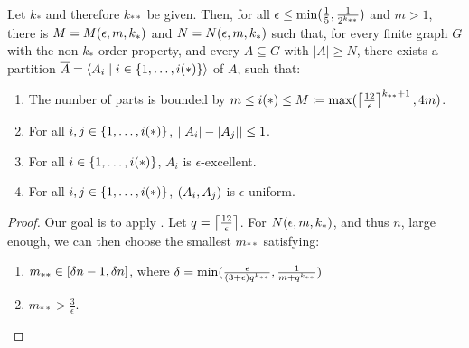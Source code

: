         \begin{theorem}[Theorem 5.18] \label{thm:minimal_conditions_for_excellent_partitions}
            Let $k_*$ and therefore $k_{**}$ be given.
            Then, for all $\epsilon \leq \min ( \frac{1}{5}, \frac{1}{2^{k_{**}}} )$ and $m > 1$, there is $M = M( \epsilon, m, k_* )$
            and $N = N( \epsilon, m, k_* )$ such that, for every finite graph $G$ with the non-$k_{*}$-order property, and
            every $A \subseteq G$ with $|A| \geq N$, there exists a partition $\overline{A} = \left< A_i \mid i \in \{ 1, \dots, i(*) \} \right>$
            of $A$, such that:
            \begin{enumerate}
                \item \label{itm:minimal_conditions_for_excellent_partitions.0} The number of parts is bounded by
                    $m \leq i(*) \leq M \coloneqq \max ( \left\lceil \frac{12}{\epsilon} \right\rceil^{k_{**}+1}, 4m )$.
                \item \label{itm:minimal_conditions_for_excellent_partitions.1}
                    For all $i, j \in \{ 1, \dots, i(*) \}$, $| | A_i |- | A_j | | \leq 1$.
                \item \label{itm:minimal_conditions_for_excellent_partitions.2}
                    For all $i \in \{ 1, \dots, i(*) \}$, $A_i$ is $\epsilon$-excellent.
                \item \label{itm:minimal_conditions_for_excellent_partitions.3}
                    For all $i, j \in \{ 1, \dots, i(*) \}$, $( A_i, A_j )$ is $\epsilon$-uniform.  
            \end{enumerate}
            \begin{proof}
                Our goal is to apply .
                Let $q = \left\lceil \frac{12}{\epsilon} \right\rceil$.
                For $N( \epsilon, m, k_* )$, and thus $n$, large enough, we can then choose the smallest $m_{**}$ satisfying:
                \begin{enumerate}[label=(\alph*), ref=\alph*]
                    \item \label{itm:minimal_conditions_for_excellent_partitions.a} $m_{**} \in [ \delta n -1, \delta n ]$, where
                        $\delta = \min ( \frac{\epsilon}{( 3 + \epsilon ) q^{k_{**}}}, \frac{1}{m + q^{k_{**}}} )$
                    \item \label{itm:minimal_conditions_for_excellent_partitions.b} $m_{**} > \frac{3}{\epsilon}$.

\end{enumerate}
\end{proof}
\end{theorem}
